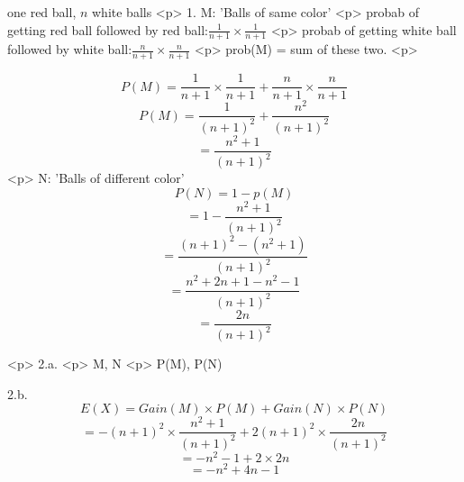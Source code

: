 one red ball, $n$ white balls
<p>
1. M: 'Balls of same color'
<p>
probab of getting red ball followed by red ball:$ \frac{1}{n+1} \times \frac{1}{n+1}$
<p>
probab of getting white ball followed by white ball:$ \frac{n}{n+1} \times \frac{n}{n+1}$
<p>
prob(M) = sum of these two.
<p>

$$P(M) = \frac{1}{n+1} \times \frac{1}{n+1}  +  \frac{n}{n+1} \times \frac{n}{n+1}  $$
$$P(M) = \frac{1}{(n+1)^2}  +  \frac{n^2}{(n+1)^2}$$
$$ = \frac{n^2+1}{(n+1)^2}$$
<p>
 N: 'Balls of different color'
 $$P(N) = 1- p(M)$$
 $$ = 1-\frac{n^2+1}{(n+1)^2}$$ 
 $$ = \frac{(n+1)^2-(n^2+1)}{(n+1)^2}$$ 
 $$ = \frac{n^2 + 2n + 1 - n^2 -1}{(n+1)^2}$$ 
 $$ = \frac{2n}{(n+1)^2}$$ 

 <p>
 2.a.
 <p>
 M, N
 <p>
 P(M), P(N)

 2.b.
$$E(X) = Gain(M) \times P(M) + Gain(N) \times P(N)$$
$$ =-(n+1)^2 \times \frac{n^2+1}{(n+1)^2} +  2(n+1)^2 \times \frac{2n}{(n+1)^2}$$ 
$$ =-n^2-1 +  2 \times 2n$$ 
$$ =-n^2+4n-1$$

 
